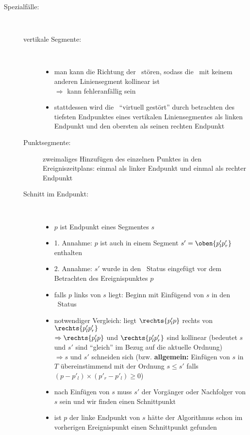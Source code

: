 \begin{description}
\begin{itemize}
\begin{itemize}
				\end{itemize}
		\end{itemize}
	\item[Spezialfälle:] \ \\\up
		\begin{description}
			\item[vertikale Segmente:] \ \\\up
				\begin{itemize}
					\item man kann die Richtung der \sweep~stören, sodass die \sweep~mit keinem anderen Liniensegment kollinear ist\\
						$\Rightarrow$ kann fehleranfällig sein
					\item stattdessen wird die \sweep~``virtuell gestört'' durch betrachten des tiefsten Endpunktes eines vertikalen Liniensegmentes als linken Endpunkt und den obersten als seinen rechten Endpunkt
				\end{itemize}
			\item[Punktsegmente:] zweimaliges Hinzufügen des einzelnen Punktes in den Ereigniszeitplans: einmal als linker Endpunkt und einmal als rechter Endpunkt
			\item[Schnitt im Endpunkt:] \ \\\up
				\begin{itemize}
					\item $p$ ist Endpunkt eines Segmentes $s$
					\item 1. Annahme: $p$ ist auch in einem Segment $s' = \oben{p'_lp'_r}$ enthalten
					\item 2. Annahme: $s'$ wurde in den \sweep~Status eingefügt vor dem Betrachten des Ereignispunktes $p$
					\item falls $p$ links von $s$ liegt: Beginn mit Einfügend von $s$ in den \sweep~Status
					\item notwendiger Vergleich: liegt $\rechts{p'_lp}$ rechts von $\rechts{p'_lp'_r}$\\
					$\Rightarrow \rechts{p'_lp}$ und $\rechts{p'_lp'_r}$ sind kollinear (bedeutet $s$ und $s'$ sind ``gleich'' im Bezug auf die aktuelle Ordnung)\\
					$\Rightarrow s$ und $s'$ schneiden sich (bzw. \textbf{allgemein:} Einfügen von $s$ in $T$ übereinstimmend mit der Ordnung $s \leq s'$ falls $(p-p'_l)\times (p'_r - p'_l)\geq 0$)
					\item nach Einfügen von $s$ muss $s'$ der Vorgänger oder Nachfolger von $s$ sein und wir finden einen Schnittpunkt
					\item ist $p$ der linke Endpunkt von $s$ hätte der Algorithmus schon im vorherigen Ereignispunkt einen Schnittpunkt gefunden
				\end{itemize}
		\end{description}
\end{description}
